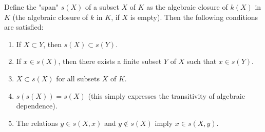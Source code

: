 Define the "span" $s(X)$ of a subset $X$ of $K$ as the algebraic closure of $k(X)$ in $K$ (the algebraic closure of $k$ in $K$, if $X$ is empty). Then the following conditions are satisfied:

\begin{enumerate}
\item[$(S_1)$] If $X \subset Y$, then $s(X) \subset s(Y)$.
\item[$(S_2)$] If $x \in s(X)$, then there exists a finite subset $Y$ of $X$ such that $x \in s(Y)$.
\item[$(S_3)$] $X \subset s(X)$ for all subsets $X$ of $K$.
\item[$(S_4)$] $s(s(X)) = s(X)$ (this simply expresses the transitivity of algebraic dependence).
\item[$(S_5)$] The relations $y \in s(X, x)$ and $y \notin s(X)$ imply $x \in s(X, y)$.
\end{enumerate}
